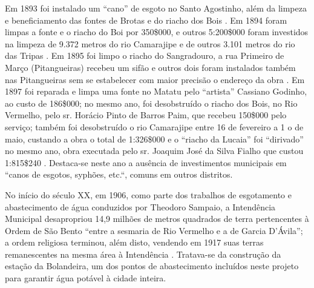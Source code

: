 Em 1893 foi instalado um ``cano'' de esgoto no Santo Agostinho, além da limpeza e beneficiamento das fontes de Brotas e do riacho dos Bois \cite[pp.~6-7]{salvador_relatorio_1893}. Em 1894 foram limpas a fonte e o riacho do Boi por 350\$000, e outros 5:200\$000 foram investidos na limpeza de 9.372 metros do rio Camarajipe e de outros 3.101 metros do rio das Tripas \cite[p.~156]{salvador_relatorio_1894}. Em 1895 foi limpo o riacho do Sangradouro, a rua Primeiro de Março (Pitangueiras) recebeu um sifão e outros dois foram instalados também nas Pitangueiras sem se estabelecer com maior precisão o endereço da obra \cite[pp.~20, 137-138]{salvador_relatorio_1895}. Em 1897 foi reparada e limpa uma fonte no Matatu pelo ``artista'' Cassiano Godinho, ao custo de 186\$000; no mesmo ano, foi desobstruído o riacho dos Bois, no Rio Vermelho, pelo sr. Horácio Pinto de Barros Paim, que recebeu 150\$000 pelo serviço; também foi desobstruído o rio Camarajipe entre 16 de fevereiro a 1 o de maio, custando a obra o total de 1:326\$000 e o ``riacho da Lucaia'' foi ``dirivado'' no mesmo ano, obra executada pelo sr. Joaquim José da Silva Fialho que custou 1:815\$240 \cite[p.~99-100]{salvador_relatorio_1897}. Destaca-se neste ano a ausência de investimentos municipais em ``canos de esgotos, syphões, etc.``, comuns em outros distritos.

No início do século XX, em 1906, como parte dos trabalhos de esgotamento e abastecimento de água conduzidos por Theodoro Sampaio, a Intendência Municipal desapropriou 14,9 milhões de metros quadrados de terra pertencentes à Ordem de São Bento ``entre a sesmaria de Rio Vermelho e a de Garcia D'Ávila''; a ordem religiosa terminou, além disto, vendendo em 1917 suas terras remanescentes na mesma área à Intendência \cite[p.~306]{VASCONCELOS2002}. Tratava-se da construção da estação da Bolandeira, um dos pontos de abastecimento incluídos neste projeto para garantir água potável à cidade inteira.

